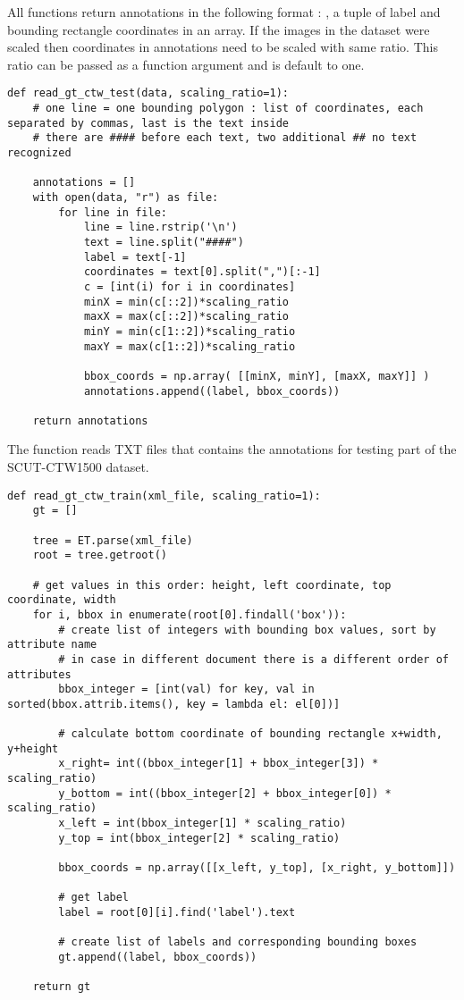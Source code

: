 All functions return annotations in the following format :
\newline {}, a tuple of label and bounding rectangle coordinates in an array. 
If the images in the dataset were scaled then coordinates in annotations need to be scaled with same ratio. This ratio can be passed as a function argument and is default to one.

\begin{lstlisting}[caption=read\_gt\_ctw\_test]
def read_gt_ctw_test(data, scaling_ratio=1):
    # one line = one bounding polygon : list of coordinates, each separated by commas, last is the text inside 
    # there are #### before each text, two additional ## no text recognized

    annotations = []
    with open(data, "r") as file:
        for line in file:
            line = line.rstrip('\n')
            text = line.split("####")
            label = text[-1]
            coordinates = text[0].split(",")[:-1]
            c = [int(i) for i in coordinates]
            minX = min(c[::2])*scaling_ratio
            maxX = max(c[::2])*scaling_ratio
            minY = min(c[1::2])*scaling_ratio
            maxY = max(c[1::2])*scaling_ratio

            bbox_coords = np.array( [[minX, minY], [maxX, maxY]] )
            annotations.append((label, bbox_coords))

    return annotations
\end{lstlisting}

The function  reads TXT files that contains the annotations for testing part of the SCUT-CTW1500 dataset.


\begin{lstlisting}[caption=read\_gt\_ctw\_train]
def read_gt_ctw_train(xml_file, scaling_ratio=1):
    gt = []

    tree = ET.parse(xml_file)
    root = tree.getroot()

    # get values in this order: height, left coordinate, top coordinate, width
    for i, bbox in enumerate(root[0].findall('box')):
        # create list of integers with bounding box values, sort by attribute name
        # in case in different document there is a different order of attributes
        bbox_integer = [int(val) for key, val in sorted(bbox.attrib.items(), key = lambda el: el[0])]
        
        # calculate bottom coordinate of bounding rectangle x+width, y+height
        x_right= int((bbox_integer[1] + bbox_integer[3]) * scaling_ratio)
        y_bottom = int((bbox_integer[2] + bbox_integer[0]) * scaling_ratio)
        x_left = int(bbox_integer[1] * scaling_ratio)
        y_top = int(bbox_integer[2] * scaling_ratio)

        bbox_coords = np.array([[x_left, y_top], [x_right, y_bottom]])

        # get label
        label = root[0][i].find('label').text

        # create list of labels and corresponding bounding boxes
        gt.append((label, bbox_coords))

    return gt
\end{lstlisting}

